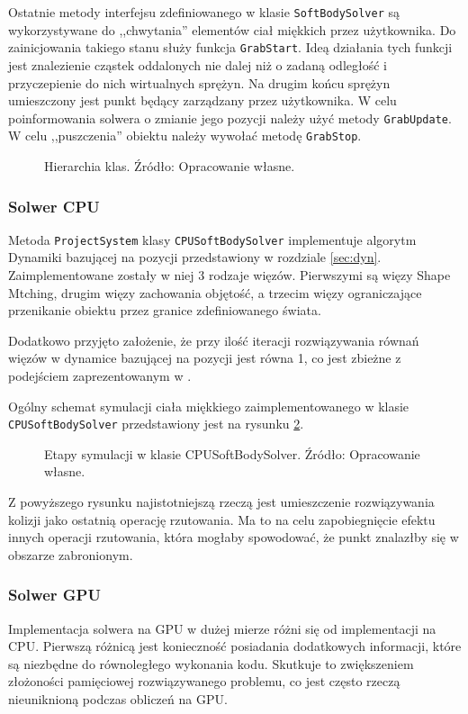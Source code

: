 {Ostatnie metody interfejsu zdefiniowanego w klasie \texttt{SoftBodySolver}
są wykorzystywane do ,,chwytania'' elementów ciał miękkich przez użytkownika. Do
zainicjowania takiego stanu służy funkcja \texttt{GrabStart}. Ideą działania
tych funkcji jest znalezienie cząstek oddalonych nie dalej niż o zadaną
odległość i przyczepienie do nich wirtualnych sprężyn. Na drugim końcu sprężyn
umieszczony jest punkt będący zarządzany przez użytkownika. W celu
poinformowania solwera o zmianie jego pozycji należy użyć metody
\texttt{GrabUpdate}. W celu ,,puszczenia'' obiektu należy wywołać metodę
\texttt{GrabStop}.


\begin{figure}[H]
\centering

\caption{Hierarchia klas. Źródło: Opracowanie własne.}
\label{class-hierarchy}
\end{figure}

\subsubsection{Solwer CPU}
Metoda \texttt{ProjectSystem} klasy \texttt{CPUSoftBodySolver}
implementuje algorytm Dynamiki bazującej na pozycji przedstawiony w rozdziale
\ref{sec:dyn}. Zaimplementowane zostały w niej 3 rodzaje więzów. Pierwszymi są więzy Shape
Mtching, drugim więzy zachowania objętość, a trzecim więzy ograniczające
przenikanie obiektu przez granice zdefiniowanego świata.

Dodatkowo przyjęto założenie, że przy ilość iteracji rozwiązywania równań więzów
w dynamice bazującej na pozycji jest równa 1, co jest zbieżne z podejściem
zaprezentowanym w \cite{diziol}.

Ogólny schemat symulacji ciała miękkiego zaimplementowanego w klasie
\texttt{CPUSoftBodySolver} przedstawiony jest na rysunku \ref{flow-cpu}.

\begin{figure}[H]
\centering

\caption{Etapy symulacji w klasie CPUSoftBodySolver. Źródło: Opracowanie własne.}
\label{flow-cpu}
\end{figure}

Z powyższego rysunku najistotniejszą rzeczą jest umieszczenie rozwiązywania
kolizji jako ostatnią operację rzutowania. Ma to na celu zapobiegnięcie efektu
innych operacji rzutowania, która mogłaby spowodować, że punkt znalazłby się w
obszarze zabronionym.

\subsubsection{Solwer GPU}
Implementacja solwera na GPU w dużej mierze różni się od implementacji na CPU.
Pierwszą różnicą jest konieczność posiadania dodatkowych informacji, które są
niezbędne do równoległego wykonania kodu. Skutkuje to zwiększeniem złożoności
pamięciowej rozwiązywanego problemu, co jest często rzeczą nieuniknioną podczas
obliczeń na GPU.

}
